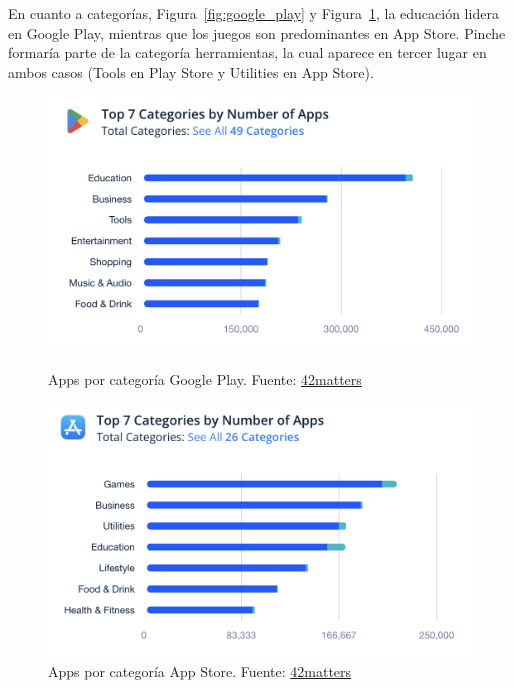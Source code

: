 En cuanto a categorías, Figura~\ref{fig:google_play} y Figura~\ref{fig:app_store}, la educación lidera en Google Play, mientras que los juegos son predominantes en App Store. Pinche formaría parte de la categoría herramientas, la cual aparece en tercer lugar en ambos casos (Tools en Play Store y Utilities en App Store).

\begin{figure}[H]
\centering
\begin{minipage}[t]{0.48\textwidth}
\centering
\includegraphics[width=\linewidth]{img/intro/google_play_categories.png}
\caption{Apps por categoría Google Play. Fuente: \href{https://42matters.com/stats\#apps-by-category}{42matters}}
\label{fig:google_play}
\end{minipage}
\hfill
\begin{minipage}[t]{0.48\textwidth}
\centering
\includegraphics[width=\linewidth]{img/intro/app_store_categories.png}
\caption{Apps por categoría App Store. Fuente: \href{https://42matters.com/stats\#apps-by-category}{42matters}}
\label{fig:app_store}
\end{minipage}
\end{figure}

